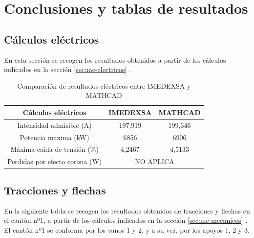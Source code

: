 \chapter{Conclusiones y tablas de resultados}
\label{ch:con}
\section{Cálculos eléctricos}
\label{sec:con-electricos}
En esta sección se recogen los resultados obtenidos a partir de los cálculos indicados en la sección \ref{sec:mc-electricos} .
\begin{table}[H]
\caption{Comparación de resultados eléctricos entre IMEDEXSA y MATHCAD}
\centering
\label{tab:calculos-electricos}
\begin{tabular}{|c|cc|}
\hline
\rowcolor[HTML]{EFEFEF} 
\textbf{Cálculos eléctricos}    & \multicolumn{1}{c|}{\cellcolor[HTML]{EFEFEF}\textbf{IMEDEXSA}} & \textbf{MATHCAD} \\ \hline
Intensidad admisible (\si{\ampere})        & \multicolumn{1}{c|}{197,919}                                   & 199,346          \\ \hline
Potencia maxima (\si{\kilo\watt})            & \multicolumn{1}{c|}{6856}                                      & 6906             \\ \hline
Máxima caída de tensión (\si{\percent})    & \multicolumn{1}{c|}{4,2467}                                    & 4,5133           \\ \hline
Perdidas por efecto corona (\si{\watt}) & \multicolumn{2}{c|}{NO APLICA}                                                    \\ \hline
\end{tabular}
\end{table}
\section{Tracciones y flechas}
\label{sec:con-flechas}
En la siguiente tabla se recogen los resultados obtenidos de tracciones y flechas en el cantón nº1, a partir de los cálculos indicados en la sección \ref{sec:mc-mecanicos} . El cantón nº1 se conforma por los vanos 1 y 2, y a su vez, por los apoyos 1, 2 y 3.

